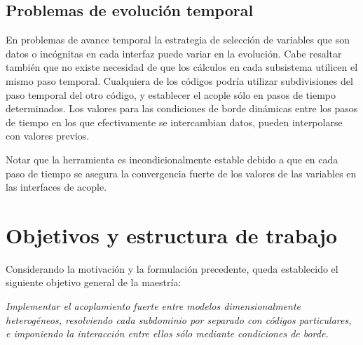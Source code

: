\subsection{Problemas de evolución temporal}
\label{1:evolucion}
En problemas de avance temporal la estrategia de selección de variables que son datos o incógnitas en cada interfaz puede variar en la evolución.
Cabe resaltar también que no existe necesidad de que los cálculos en cada subsistema utilicen el mismo paso temporal.
Cualquiera de los códigos podría utilizar subdivisiones del paso temporal del otro código,
y establecer el acople sólo en pasos de tiempo determinados.
Los valores para las condiciones de borde dinámicas entre los pasos de tiempo en los que efectivamente se intercambian datos,
pueden interpolarse con valores previos.

Notar que la herramienta es incondicionalmente estable debido a que 
en cada paso de tiempo se asegura la convergencia fuerte de los valores de las variables en las interfaces de acople.

\section{Objetivos y estructura de trabajo}
\label{1:objetivos}
Considerando la motivación y la formulación precedente, queda establecido el siguiente objetivo general de la maestría:

\vspace{1em}
\begin{addmargin}[1.5em]{1.5em}
\textit{Implementar el acoplamiento fuerte entre modelos dimensionalmente heterogéneos,
resolviendo cada subdominio por separado con códigos particulares, e imponiendo la
interacción entre ellos sólo mediante condiciones de borde.}
\end{addmargin}
\vspace{1em}

